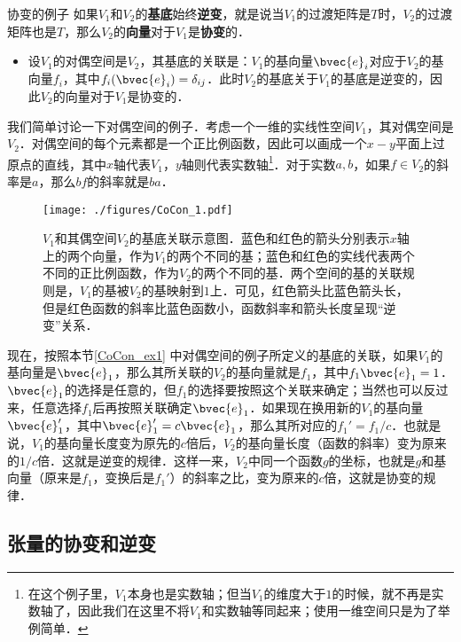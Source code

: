 \begin{example}{协变的例子}\label{CoCon_ex1}
如果$V_1$和$V_2$的\textbf{基底}始终\textbf{逆变}，就是说当$V_1$的过渡矩阵是$T$时，$V_2$的过渡矩阵也是$T$，那么$V_2$的\textbf{向量}对于$V_1$是\textbf{协变}的．
\begin{itemize}
\item 设$V_1$的对偶空间是$V_2$，其基底的关联是：$V_1$的基向量$\bvec{e}_i$对应于$V_2$的基向量$f_i$，其中$f_i(\bvec{e}_i)=\delta_{ij}$．此时$V_2$的基底关于$V_1$的基底是逆变的，因此$V_2$的向量对于$V_1$是协变的．
\end{itemize}
\end{example}

我们简单讨论一下对偶空间的例子．考虑一个一维的实线性空间$V_1$，其对偶空间是$V_2$．对偶空间的每个元素都是一个正比例函数，因此可以画成一个$x-y$平面上过原点的直线，其中$x$轴代表$V_1$，$y$轴则代表实数轴\footnote{在这个例子里，$V_1$本身也是实数轴；但当$V_1$的维度大于$1$的时候，就不再是实数轴了，因此我们在这里不将$V_1$和实数轴等同起来；使用一维空间只是为了举例简单．}．对于实数$a, b$，如果$f\in V_2$的斜率是$a$，那么$bf$的斜率就是$ba$．

\begin{figure}[ht]
\centering
\texttt{[image: ./figures/CoCon\_1.pdf]}
\caption{$V_1$和其偶空间$V_2$的基底关联示意图．蓝色和红色的箭头分别表示$x$轴上的两个向量，作为$V_1$的两个不同的基；蓝色和红色的实线代表两个不同的正比例函数，作为$V_2$的两个不同的基．两个空间的基的关联规则是，$V_1$的基被$V_2$的基映射到$1$上．可见，红色箭头比蓝色箭头长，但是红色函数的斜率比蓝色函数小，函数斜率和箭头长度呈现“逆变”关系．} \label{CoCon_fig1}
\end{figure}

现在，按照本节\autoref{CoCon_ex1} 中对偶空间的例子所定义的基底的关联，如果$V_1$的基向量是$\bvec{e}_1$，那么其所关联的$V_2$的基向量就是$f_1$，其中$f_1{\bvec{e}_1}=1$．$\bvec{e}_1$的选择是任意的，但$f_1$的选择要按照这个关联来确定；当然也可以反过来，任意选择$f_1$后再按照关联确定$\bvec{e}_1$．如果现在换用新的$V_1$的基向量$\bvec{e}_1'$，其中$\bvec{e}_1'=c\bvec{e}_1$，那么其所对应的$f_1'=f_1/c$．也就是说，$V_1$的基向量长度变为原先的$c$倍后，$V_2$的基向量长度（函数的斜率）变为原来的$1/c$倍．这就是逆变的规律．这样一来，$V_2$中同一个函数$g$的坐标，也就是$g$和基向量（原来是$f_1$，变换后是$f_1'$）的斜率之比，变为原来的$c$倍，这就是协变的规律．

\subsection{张量的协变和逆变}












